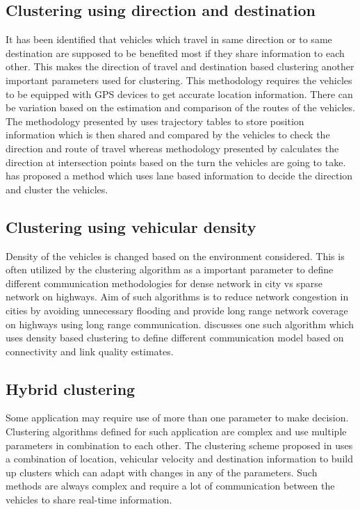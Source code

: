 \documentclass[]{ccs-thesis}
\begin{document}
\subsection{Clustering using direction and destination}

It has been identified that vehicles which travel in same direction or to same destination are supposed to be benefited
most if they share information to each other. This makes the direction of travel and destination based clustering another
important parameters used for clustering. This methodology requires the vehicles to be equipped with \ac{GPS} devices to
get accurate location information. There can be variation based on the estimation and comparison of the routes of the
vehicles. The methodology presented by \textcite{6685518} uses trajectory tables to store position information which is
then shared and compared by the vehicles to check the direction and route of travel whereas methodology presented
by \textcite{5416361} calculates the direction at intersection points based on the turn the vehicles are going to take.
\textcite{5735785} has proposed a method which uses lane based information to decide the direction and cluster the vehicles.

\subsection{Clustering using vehicular density}

Density of the vehicles is changed based on the environment considered. This is often utilized by the clustering
algorithm as a important parameter to define different communication methodologies for dense network in city vs
sparse network on highways. Aim of such algorithms is to reduce network congestion in cities by avoiding unnecessary
flooding and provide long range network coverage on highways using long range communication. \textcite{4976256} discusses
one such algorithm which uses density based clustering to define different communication model based on connectivity and
link quality estimates.

\subsection{Hybrid clustering}

Some application may require use of more than one parameter to make decision. Clustering algorithms defined for such
application are complex and use multiple parameters in combination to each other. The clustering scheme proposed
in \cite{6077004} uses a combination of location, vehicular velocity and destination information to build up clusters
which can adapt with changes in any of the parameters. Such methods are always complex and require a lot of communication
between the vehicles to share real-time information.
\end{document}
